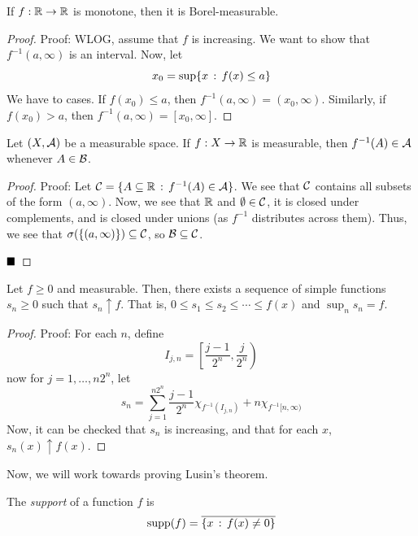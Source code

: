 
\begin{lemma}
    If $f : \R \to \R$ is monotone, then it is Borel-measurable. 
\end{lemma}
\begin{proof}{Proof:}
	WLOG, assume that $f$ is increasing. We want to show that $f^{-1}(a, \infty)$ is an interval. Now, let
    \[ x_0 = \sup\{x \col f(x) \leq a\} \]
    We have to cases. If $f(x_0) \leq a$, then $f^{-1}(a, \infty) = (x_0, \infty)$. Similarly, if $f(x_0) > a$, then $f^{-1}(a, \infty) = [x_0, \infty]$. 
\end{proof}

\begin{lemma}
    Let $(X, \cal{A})$ be a measurable space. If $f : X \to \R$ is measurable, then $f^{-1}(A) \in \cal{A}$ whenever $A \in \cal{B}$. 
\end{lemma}
\begin{proof}{Proof:}
    Let $\cal{C} = \{A \subseteq \R \col f^{-1}(A) \in \cal{A}\}$. We see that $\cal{C}$ contains all subsets of the form $(a, \infty)$. Now, we see that $\R$ and $\emptyset \in \cal{C}$, it is closed under complements, and is closed under unions (as $f^{-1}$ distributes across them). Thus, we see that $\sigma(\{(a, \infty)\}) \subseteq \cal{C}$, so $\cal{B} \subseteq \cal{C}$. 

    $\qed$
\end{proof}

\begin{lemma}
    Let $f \geq 0$ and measurable. Then, there exists a sequence of simple functions $s_n \geq 0$ such that $s_n \uparrow f$. That is, $0 \leq s_1 \leq s_2 \leq \cdots \leq f(x)$ and $\sup_{n} s_n = f$. 
\end{lemma}
\begin{proof}{Proof:}
    For each $n$, define
    \[ I_{j, n} = \left[\frac{j - 1}{2^{n}}, \frac{j}{2^{n}}\right) \]
    now for $j = 1, \ldots, n2^{n}$, let
    \[ s_n = \sum_{j = 1}^{n2^{n}} \frac{j - 1}{2^{n}}\chi_{f^{-1}(I_{j, n})} + n\chi_{f^{-1}[n, \infty)} \]
    Now, it can be checked that $s_n$ is increasing, and that for each $x$, $s_n(x) \uparrow f(x)$. 
\end{proof}
Now, we will work towards proving Lusin's theorem.



\begin{definition}
    The \emph{support} of a function $f$ is
    \[ \text{supp}(f) = \overline{\{x \col f(x) \ne 0\}} \]
\end{definition}

